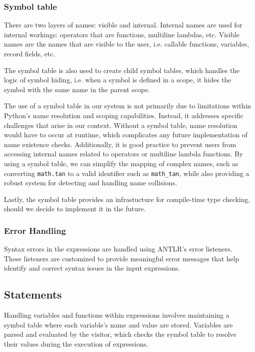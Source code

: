 \subsubsection{Symbol table}

There are two layers of names: visible and internal. Internal names are used for internal workings: operators that are functions, multiline lambdas, etc. Visible names are the names that are visible to the user, i.e. callable functions, variables, record fields, etc.

The symbol table is also used to create child symbol tables, which handles the logic of symbol hiding, i.e. when a symbol is defined in a scope, it hides the symbol with the same name in the parent scope.

The use of a symbol table in our system is not primarily due to limitations within Python’s name resolution and scoping capabilities. Instead, it addresses specific challenges that arise in our context. Without a symbol table, name resolution would have to occur at runtime, which complicates any future implementation of name existence checks. Additionally, it is good practice to prevent users from accessing internal names related to operators or multiline lambda functions. By using a symbol table, we can simplify the mapping of complex names, such as converting \texttt{math.tan} to a valid identifier such as \texttt{math\_tan}, while also providing a robust system for detecting and handling name collisions.

Lastly, the symbol table provides an infrastucture for compile-time type checking, should we decide to implement it in the future.

\subsubsection{Error Handling}

Syntax errors in the expressions are handled using ANTLR's error listeners. These listeners are customized to provide meaningful error messages that help identify and correct syntax issues in the input expressions.

\subsection{Statements}

Handling variables and functions within expressions involves maintaining a symbol table where each variable's name and value are stored. Variables are parsed and evaluated by the visitor, which checks the symbol table to resolve their values during the execution of expressions.

